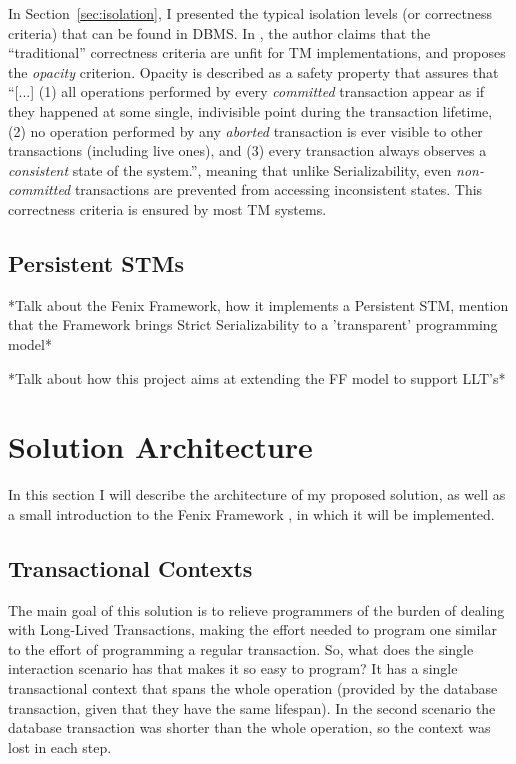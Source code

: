 \documentclass{llncs}
\begin{document}
In Section~\ref{sec:isolation}, I presented the typical isolation
levels (or correctness criteria) that can be found in DBMS. In
\cite{guerraoui2008correctness}, the author claims that the
``traditional'' correctness criteria are unfit for TM implementations,
and proposes the {\it opacity} criterion. Opacity is described as a
safety property that assures that ``[...] (1) all operations performed
by every {\it committed} transaction appear as if they happened at
some single, indivisible point during the transaction lifetime, (2) no
operation performed by any {\it aborted} transaction is ever visible
to other transactions (including live ones), and (3) every transaction
always observes a {\it consistent} state of the system.'', meaning
that unlike Serializability, even {\it non-committed} transactions are
prevented from accessing inconsistent states. This correctness
criteria is ensured by most TM systems.

\subsection{Persistent STMs}

*Talk about the Fenix Framework, how it implements a Persistent STM,
mention that the Framework brings Strict Serializability to a
'transparent' programming model* \cite{fernandes2011strict}
\cite{guerraoui2008correctness} \cite{cachopo2006versioned}

*Talk about how this project aims at extending the FF model to support
LLT's*

\section{Solution Architecture}
\label{sec:arch}

In this section I will describe the architecture of my proposed
solution, as well as a small introduction to the Fenix Framework
\cite{fernandes2011strict}, in which it will be implemented.

\subsection{Transactional Contexts}

The main goal of this solution is to relieve programmers of the burden
of dealing with Long-Lived Transactions, making the effort needed to
program one similar to the effort of programming a regular
transaction. So, what does the single interaction scenario has that
makes it so easy to program? It has a single transactional context
that spans the whole operation (provided by the database transaction,
given that they have the same lifespan). In the second scenario the
database transaction was shorter than the whole operation, so the
context was lost in each step.
\end{document}
